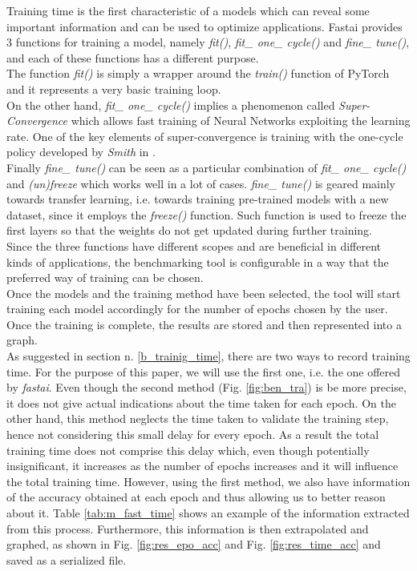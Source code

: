 Training time is the first characteristic of a models which can reveal some important information and can be used to optimize applications. 
Fastai provides 3 functions for training a model, namely \textit{fit()}, \textit{fit\_ one\_ cycle()} and \textit{fine\_ tune()}, and each of these functions has a different purpose.\\
The function \textit{fit()} is simply a wrapper around the \textit{train()} function of PyTorch and it represents a very basic training loop.\cite{fastaidocs} \\
On the other hand, \textit{fit\_ one\_ cycle()} implies a phenomenon called \textit{Super-Convergence} which allows fast training of Neural Networks exploiting the learning rate. \cite{DBLP:journals/corr/abs-1708-07120}
One of the key elements of super-convergence is training with the one-cycle policy developed by \textit{Smith} in \cite{DBLP:journals/corr/abs-1803-09820}. \cite{DBLP:journals/corr/abs-1708-07120}\\
Finally \textit{fine\_ tune()} can be seen as a particular combination of \textit{fit\_ one\_ cycle()} and \textit{(un)freeze} which works well in a lot of cases. \textit{fine\_ tune()} is geared mainly towards transfer learning, i.e. towards training pre-trained models with a new dataset, since it employs the \textit{freeze()} function. Such function is used to freeze the first layers so that the weights do not get updated during further training.\cite{fastaidocs}\\
Since the three functions have different scopes and are beneficial in different kinds of applications, the benchmarking tool is configurable in a way that the preferred way of training can be chosen. \\
Once the models and the training method have been selected, the tool will start training each model accordingly for the number of epochs chosen by the user. Once the training is complete, the results are stored and then represented into a graph. \\
As suggested in section n. \ref{b_trainig_time}, there are two ways to record training time. For the purpose of this paper, we will use the first one, i.e. the one offered by \textit{fastai}. Even though the second method (Fig. \ref{fig:ben_tra}) is be more precise, it does not give actual indications about the time taken for each epoch. On the other hand, this method neglects the time taken to validate the training step, hence not considering this small delay for every epoch. As a result the total training time does not comprise this delay which, even though potentially insignificant, it increases as the number of epochs increases and it will influence the total training time. However, using the first method, we also have information of the accuracy obtained at each epoch
and thus allowing us to better reason about it. Table \ref{tab:m_fast_time} shows an example of the information extracted from this process. Furthermore, this information is then extrapolated and graphed, as shown in Fig. \ref{fig:res_epo_acc} and Fig. \ref{fig:res_time_acc} and saved as a serialized file. 




